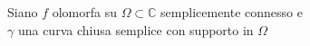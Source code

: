 \documentclass[preview]{standalone}
\begin{document}
\begin{center}
Siano $f$ olomorfa su $\Omega \subset \mathbb{C}$ semplicemente connesso e \\$\gamma$ una curva chiusa semplice con supporto in $\Omega$
\end{center}
\end{document}
